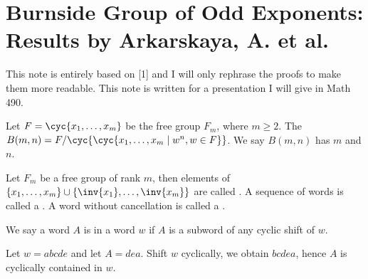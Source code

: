 \section{Burnside Group of Odd Exponents: Results by Arkarskaya, A. et al.}
\par
This note is entirely based on [1] and I will only rephrase the proofs to make them more readable. This note is written for a presentation I will give in Math 490.
\begin{definition}
    Let $F=\cyc{{x}_{1},\dots,{x}_{m}}$ be the free group ${F}_{m}$, where $m\ge 2$. The  $B(m,n)=F/\cyc{\cyc{{x}_{1},\dots,{x}_{m}\mid{w}^{n},w\in F}}$. We say $B(m,n)$ has  $m$ and  $n$.
\end{definition}
\begin{definition}
    Let ${F}_{m}$ be a free group of rank $m$, then elements of $\{{x}_{1},\dots,{x}_{m}\}\cup\{\inv{{x}_{1}},\dots,\inv{{x}_{m}}\}$ are called . A sequence of words is called a . A word without cancellation is called a .
\end{definition}
\begin{definition}
    We say a word $A$ is  in a word $w$ if $A$ is a subword of any cyclic shift of $w$.
\end{definition}
\begin{example}
    Let $w=abcde$ and let $A=dea$. Shift $w$ cyclically, we obtain $bcdea$, hence $A$ is cyclically contained in $w$.
\end{example}
\begin{definition}
    
\end{definition}
